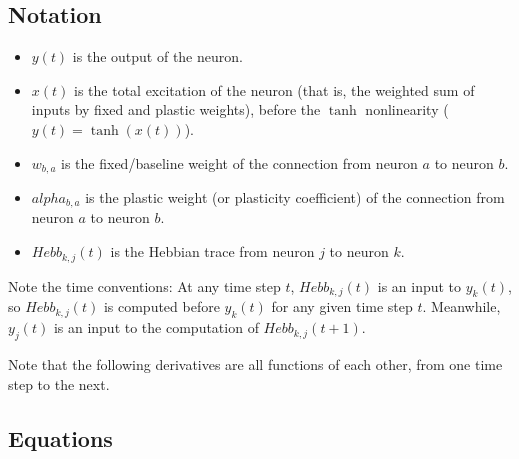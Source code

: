 \documentclass{report}
\begin{document}
\subsection*{Notation}

\begin{itemize}

\item $y(t)$ is the output of the neuron.

\item $x(t)$ is the total excitation of the neuron (that is, the weighted sum of inputs by fixed and plastic weights), before the $\tanh$ nonlinearity ($y(t)=\tanh(x(t))$).

\item $w_{b,a}$ is the fixed/baseline weight of the connection from neuron $a$ to neuron $b$. 

\item $alpha_{b,a}$ is the plastic weight (or plasticity coefficient) of the connection from neuron $a$ to neuron $b$. 

\item $Hebb_{k,j}(t)$ is the Hebbian trace from neuron $j$ to neuron $k$.

\end{itemize}

Note the time conventions: At any time step $t$, $Hebb_{k,j}(t)$ is an input to $y_k(t)$, so  $Hebb_{k,j}(t)$ is computed before $y_k(t)$ for any given time step $t$. Meanwhile, $y_j(t)$ is an input to the computation of $Hebb_{k,j}(t+1)$.

Note that the following derivatives are all functions of each other, from one time step to the next.


\subsection*{Equations}
\end{document}
